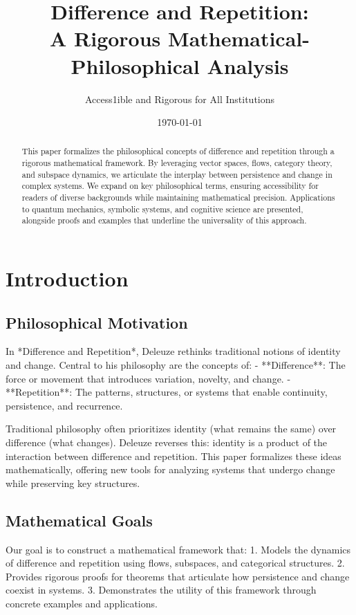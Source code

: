 \documentclass[12pt]{article}
\title{Difference and Repetition: \\A Rigorous Mathematical-Philosophical Analysis}
\author{Access1ible and Rigorous for All Institutions}
\date{\today}
\theoremstyle{plain}
\theoremstyle{definition}
\begin{document}
\maketitle

\begin{abstract}
This paper formalizes the philosophical concepts of difference and repetition through a rigorous mathematical framework. By leveraging vector spaces, flows, category theory, and subspace dynamics, we articulate the interplay between persistence and change in complex systems. We expand on key philosophical terms, ensuring accessibility for readers of diverse backgrounds while maintaining mathematical precision. Applications to quantum mechanics, symbolic systems, and cognitive science are presented, alongside proofs and examples that underline the universality of this approach.
\end{abstract}

\section{Introduction}

\subsection{Philosophical Motivation}

In *Difference and Repetition*, Deleuze rethinks traditional notions of identity and change. Central to his philosophy are the concepts of:
- **Difference**: The force or movement that introduces variation, novelty, and change.
- **Repetition**: The patterns, structures, or systems that enable continuity, persistence, and recurrence.

Traditional philosophy often prioritizes identity (what remains the same) over difference (what changes). Deleuze reverses this: identity is a product of the interaction between difference and repetition. This paper formalizes these ideas mathematically, offering new tools for analyzing systems that undergo change while preserving key structures.

\subsection{Mathematical Goals}

Our goal is to construct a mathematical framework that:
1. Models the dynamics of difference and repetition using flows, subspaces, and categorical structures.
2. Provides rigorous proofs for theorems that articulate how persistence and change coexist in systems.
3. Demonstrates the utility of this framework through concrete examples and applications.
\end{document}
